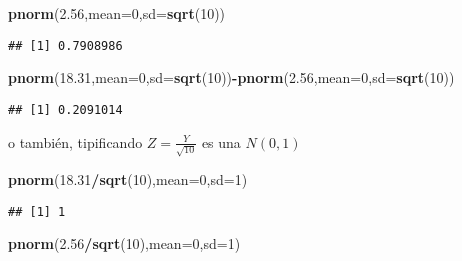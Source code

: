 \documentclass[]{article}
\newenvironment{Shaded}{\begin{snugshade}}{\end{snugshade}}
\newcommand{\DataTypeTok}[1]{\textcolor[rgb]{0.13,0.29,0.53}{#1}}
\newcommand{\DecValTok}[1]{\textcolor[rgb]{0.00,0.00,0.81}{#1}}
\newcommand{\FloatTok}[1]{\textcolor[rgb]{0.00,0.00,0.81}{#1}}
\newcommand{\KeywordTok}[1]{\textcolor[rgb]{0.13,0.29,0.53}{\textbf{#1}}}
\newcommand{\NormalTok}[1]{#1}
\newcommand{\OperatorTok}[1]{\textcolor[rgb]{0.81,0.36,0.00}{\textbf{#1}}}
\begin{document}
\begin{Shaded}
\begin{Highlighting}[]
\KeywordTok{pnorm}\NormalTok{(}\FloatTok{2.56}\NormalTok{,}\DataTypeTok{mean=}\DecValTok{0}\NormalTok{,}\DataTypeTok{sd=}\KeywordTok{sqrt}\NormalTok{(}\DecValTok{10}\NormalTok{))}
\end{Highlighting}
\end{Shaded}

\begin{verbatim}
## [1] 0.7908986
\end{verbatim}

\begin{Shaded}
\begin{Highlighting}[]
\KeywordTok{pnorm}\NormalTok{(}\FloatTok{18.31}\NormalTok{,}\DataTypeTok{mean=}\DecValTok{0}\NormalTok{,}\DataTypeTok{sd=}\KeywordTok{sqrt}\NormalTok{(}\DecValTok{10}\NormalTok{))}\OperatorTok{-}\KeywordTok{pnorm}\NormalTok{(}\FloatTok{2.56}\NormalTok{,}\DataTypeTok{mean=}\DecValTok{0}\NormalTok{,}\DataTypeTok{sd=}\KeywordTok{sqrt}\NormalTok{(}\DecValTok{10}\NormalTok{))}
\end{Highlighting}
\end{Shaded}

\begin{verbatim}
## [1] 0.2091014
\end{verbatim}

o también, tipificando \(Z=\frac{Y}{\sqrt{10}}\) es una \(N(0,1)\)

\begin{Shaded}
\begin{Highlighting}[]
\KeywordTok{pnorm}\NormalTok{(}\FloatTok{18.31}\OperatorTok{/}\KeywordTok{sqrt}\NormalTok{(}\DecValTok{10}\NormalTok{),}\DataTypeTok{mean=}\DecValTok{0}\NormalTok{,}\DataTypeTok{sd=}\DecValTok{1}\NormalTok{)}
\end{Highlighting}
\end{Shaded}

\begin{verbatim}
## [1] 1
\end{verbatim}

\begin{Shaded}
\begin{Highlighting}[]
\KeywordTok{pnorm}\NormalTok{(}\FloatTok{2.56}\OperatorTok{/}\KeywordTok{sqrt}\NormalTok{(}\DecValTok{10}\NormalTok{),}\DataTypeTok{mean=}\DecValTok{0}\NormalTok{,}\DataTypeTok{sd=}\DecValTok{1}\NormalTok{)}
\end{Highlighting}
\end{Shaded}
\end{document}
